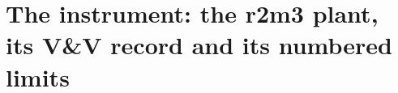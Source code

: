 \section{The instrument: the r2m3 plant, its V\&V record and its numbered limits}\label{sec:the_instrument}


